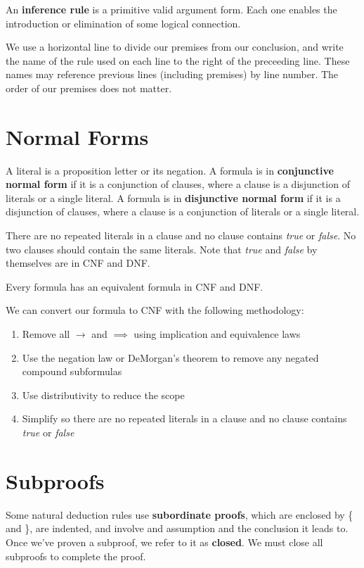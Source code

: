 \documentclass[12pt]{article}
\begin{document}
An {\bf inference rule} is a primitive valid argument form. Each one enables the introduction or elimination of some logical connection.

We use a horizontal line to divide our premises from our conclusion, and write the name of the rule used on each line to the right of the preceeding line. These names may reference previous lines (including premises) by line number. The order of our premises does not matter.

\section*{Normal Forms}
A literal is a proposition letter or its negation. A formula is in {\bf conjunctive normal form} if it is a conjunction of clauses, where a clause is a disjunction of literals or a single literal. A formula is in {\bf disjunctive normal form} if it is a disjunction of clauses, where a clause is a conjunction of literals or a single literal.

There are no repeated literals in a clause and no clause contains \emph{true} or \emph{false}. No two clauses should contain the same literals. Note that \emph{true} and \emph{false} by themselves are in CNF and DNF.

Every formula has an equivalent formula in CNF and DNF.

We can convert our formula to CNF with the following methodology:
\begin{enumerate}
\item Remove all $\rightarrow$ and $\implies$ using implication and equivalence laws
\item Use the negation law or DeMorgan's theorem to remove any negated compound subformulas
\item Use distributivity to reduce the scope
\item Simplify so there are no repeated literals in a clause and no clause contains \emph{true} or \emph{false}
\end{enumerate}

\section*{Subproofs}
Some natural deduction rules use {\bf subordinate proofs}, which are enclosed by \{ and \}, are indented, and involve and assumption and the conclusion it leads to. Once we've proven a subproof, we refer to it as {\bf closed}. We must close all subproofs to complete the proof.
\end{document}
